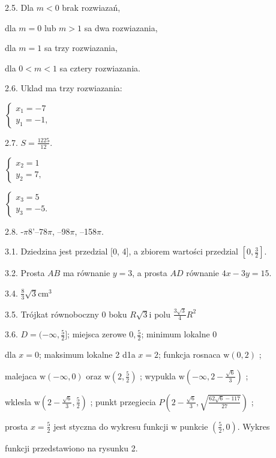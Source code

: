 \documentclass[a4paper,12pt]{article}
\begin{document}
2.5. Dla $m<0$ brak rozwiazań,

dla $m=0$ lub $m>1$ sa dwa rozwiazania,

dla $m=1$ sa trzy rozwiazania,

dla $0<m<1$ sa cztery rozwiazania.

2.6. Uklad ma trzy rozwiazania:

$\left\{\begin{array}{l}
x_{1}=-7\\
y_{1}=-1,
\end{array}\right.$

2.7. $S=\displaystyle \frac{1225}{12}.$

$\left\{\begin{array}{l}
x_{2}=1\\
y_{2}=7,
\end{array}\right.$

$\left\{\begin{array}{l}
x_{3}=5\\
y_{3}=-5.
\end{array}\right.$

2.8. -$\pi$8'--78$\pi$, --98$\pi$, --158$\pi$.

3.1. Dziedzina jest przedzial $[0$, 4$]$, a zbiorem wartości przedzial $[0,\displaystyle \frac{3}{2}]$.

3.2. Prosta $AB$ ma równanie $y=3$, a prosta $AD$ równanie $4x-3y=15$.

3.4. $\displaystyle \frac{8}{3}\sqrt{3}\mathrm{c}\mathrm{m}^{3}$

3.5. Trójkat równoboczny $0$ boku $R\sqrt{3}\mathrm{i}$ polu $\displaystyle \frac{3\sqrt{3}}{4}R^{2}$

3.6. $D = (-\displaystyle \infty,\frac{5}{2}]$; miejsca zerowe $0, \displaystyle \frac{5}{2}$; minimum lokalne 0

dla $x = 0$; maksimum lokalne 2 d1a $x = 2$; funkcja rosnaca $\mathrm{w} (0,2)$ ;

malejaca $\mathrm{w} (-\infty,0)$ oraz $\mathrm{w} (2,\displaystyle \frac{5}{2})$ ; wypukla $\mathrm{w} (-\displaystyle \infty,2-\frac{\sqrt{6}}{3})$ ;

wklesla $\mathrm{w} (2-\displaystyle \frac{\sqrt{6}}{3},\frac{5}{2})$ ; punkt przegiecia $P(2-\displaystyle \frac{\sqrt{6}}{3},\sqrt{\frac{62\sqrt{6}-117}{27}})$ ;

prosta $x= \displaystyle \frac{5}{2}$ jest styczna do wykresu funkcji $\mathrm{w}$ punkcie $(\displaystyle \frac{5}{2},0)$. Wykres

funkcji przedstawiono na rysunku 2.
\end{document}
